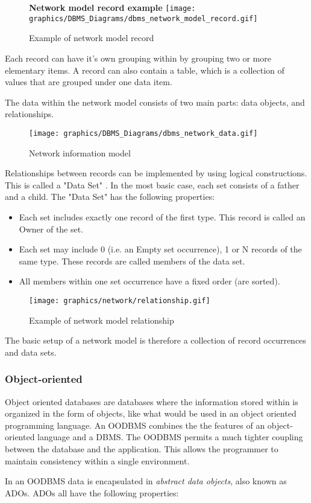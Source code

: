\documentclass[letterpaper, 12pt]{article}
\renewcommand{\includegraphics}[2][]{\fbox{}}
\begin{document}
\begin{figure}
  \centering
  \textbf{Network model record example}
  \texttt{[image: graphics/DBMS\_Diagrams/dbms\_network\_model\_record.gif]}
  \caption{Example of network model record}
  \cite{network_model_coronet}
\end{figure}

Each record can have it's own grouping within by grouping two or more elementary items.
A record can also contain a table, which is a collection of values that are grouped 
under one data item. 
\par\vspace{\baselineskip}
The data within the network model consists of two main parts: data objects, and
relationships.
 
\begin{figure}
  \centering
  \texttt{[image: graphics/DBMS\_Diagrams/dbms\_network\_data.gif]}
  \caption{Network information model}
  \cite{network_model_coronet}
\end{figure}

Relationships between records can be implemented by using logical constructions. 
This is called a "Data Set" . In the most basic case, each set consists of a father 
and a child. The "Data Set" has the following properties: 

\begin{itemize}
  \item Each set includes exactly one record of the first type. This record is called an Owner of the set.
  \item Each set may include 0 (i.e. an Empty set occurrence), 1 or N records of the same type. These records are called members of the data set.
  \item All members within one set occurrence have a fixed order (are sorted).
\end{itemize}

\begin{figure}
  \centering
  \texttt{[image: graphics/network/relationship.gif]}
  \caption{Example of network model relationship}
\end{figure}

The basic setup of a network model is therefore a collection of record occurrences and
data sets. 

\subsubsection{Object-oriented}
Object oriented databases are databases where the information stored within is organized
in the form of objects, like what would be used in an object oriented programming
language. An OODBMS combines the the features of an object-oriented language and a
DBMS. The OODBMS permits a much tighter coupling between the database and the application. This allows the programmer to maintain consistency within a single environment. 
\par\vspace{\baselineskip}
In an OODBMS data is encapsulated in \textit{abstract data objects}, also known 
as ADOs. ADOs all have the following properties: 
\end{document}
